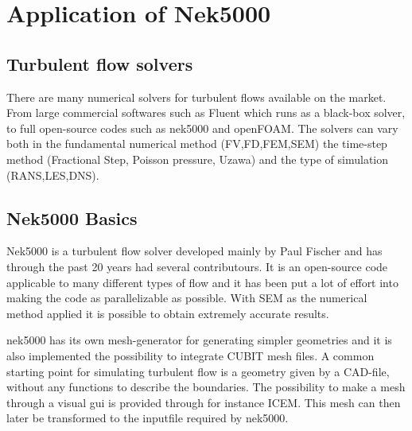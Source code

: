 
\chapter{Application of Nek5000} %

\label{problem} %


\section{Turbulent flow solvers}

There are many numerical solvers for turbulent flows available on the market.
From large commercial softwares such as Fluent which runs as a 
black-box solver, to full open-source codes such as nek5000 and openFOAM. 
The solvers can vary both in the fundamental numerical method (FV,FD,FEM,SEM) 
the time-step method (Fractional Step, Poisson pressure, Uzawa) 
and the type of simulation (RANS,LES,DNS).


\section{Nek5000 Basics }
Nek5000 is a turbulent flow solver developed mainly by Paul Fischer
and has through the past 20 years had several contributours. 
It is an open-source code applicable to many different types of flow 
and it has been put a lot of effort into making the code as parallelizable as possible.
With SEM as the numerical method applied it is possible to obtain extremely accurate results.  

nek5000 has its own mesh-generator for generating simpler geometries and it is also implemented the possibility to integrate CUBIT mesh 
files. A common starting point for simulating turbulent flow is a geometry given by a CAD-file,
without any functions to describe the boundaries.
The possibility to make a mesh through a visual gui is provided through for instance ICEM.
This mesh can then later be transformed to the inputfile required by nek5000. 

